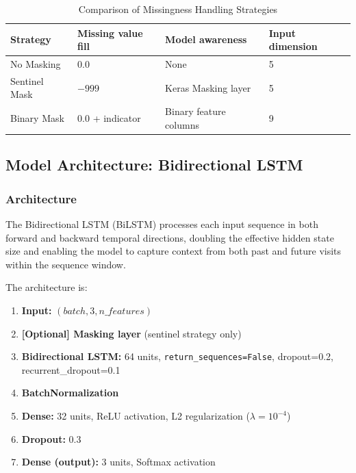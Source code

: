 \documentclass[12pt,singleside,a4paper]{article}
\begin{document}
\begin{table}[h]
\centering
\caption{Comparison of Missingness Handling Strategies}
\begin{tabular}{p{3cm} p{3cm} p{3.5cm} p{3.5cm}}
\toprule
\textbf{Strategy} & \textbf{Missing value fill} & \textbf{Model awareness} & \textbf{Input dimension} \\
\midrule
No Masking & 0.0 & None & 5 \\
Sentinel Mask & $-999$ & Keras Masking layer & 5 \\
Binary Mask & 0.0 + indicator & Binary feature columns & 9 \\
\bottomrule
\end{tabular}
\label{tab:masking_strategies}
\end{table}

\subsection{Model Architecture: Bidirectional LSTM}

\subsubsection{Architecture}
The Bidirectional LSTM (BiLSTM) processes each input sequence in both forward and backward temporal directions, doubling the effective hidden state size and enabling the model to capture context from both past and future visits within the sequence window.

The architecture is:
\begin{enumerate}
    \item \textbf{Input:} $(batch, 3, n\_features)$
    \item \textbf{[Optional] Masking layer} (sentinel strategy only)
    \item \textbf{Bidirectional LSTM:} 64 units, \texttt{return\_sequences=False}, dropout=0.2, recurrent\_dropout=0.1
    \item \textbf{BatchNormalization}
    \item \textbf{Dense:} 32 units, ReLU activation, L2 regularization ($\lambda = 10^{-4}$)
    \item \textbf{Dropout:} 0.3
    \item \textbf{Dense (output):} 3 units, Softmax activation
\end{enumerate}
\end{document}
